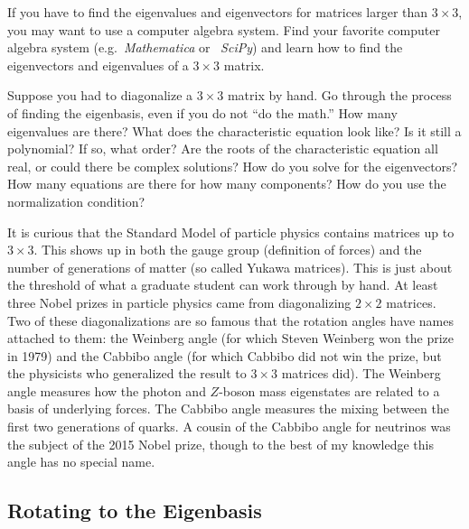 \documentclass[12pt, oneside]{report}    %
\begin{document}
\begin{exercise}
If you have to find the eigenvalues and eigenvectors for matrices larger than $3\times 3$, you may want to use a computer algebra system. Find your favorite computer algebra system (e.g.~\emph{Mathematica} or ~\emph{SciPy}) and learn how to find the eigenvectors and eigenvalues of a $3\times 3$ matrix. 
\end{exercise}

\begin{exercise}
Suppose you had to diagonalize a $3\times 3$ matrix by hand. Go through the process of finding the eigenbasis, even if you do not ``do the math.'' How many eigenvalues are there? What does the characteristic equation look like? Is it still a polynomial? If so, what order? Are the roots of the characteristic equation all real, or could there be complex solutions? How do you solve for the eigenvectors? How many equations are there for how many components? How do you use the normalization condition? 
\end{exercise}

\begin{example}
It is curious that the Standard Model of particle physics contains matrices up to $3\times 3$. This shows up in both the gauge group (definition of forces) and the number of generations of matter (so called Yukawa matrices). This is just about the threshold of what a graduate student can work through by hand. At least three Nobel prizes in particle physics came from diagonalizing $2\times 2$ matrices. Two of these diagonalizations are so famous that the rotation angles have names attached to them: the Weinberg angle (for which Steven Weinberg won the prize in 1979) and the Cabbibo angle (for which Cabbibo did not win the prize, but the physicists who generalized the result to $3\times 3$ matrices did). The Weinberg angle measures how the photon and $Z$-boson mass eigenstates are related to a basis of underlying forces. The Cabbibo angle measures the mixing between the first two generations of quarks. A cousin of the Cabbibo angle for neutrinos was the subject of the 2015 Nobel prize, though to the best of my knowledge this angle has no special name.
\end{example}

\subsection{Rotating to the Eigenbasis}
\label{sec:rotation:to:eigenbasis}
\end{document}
